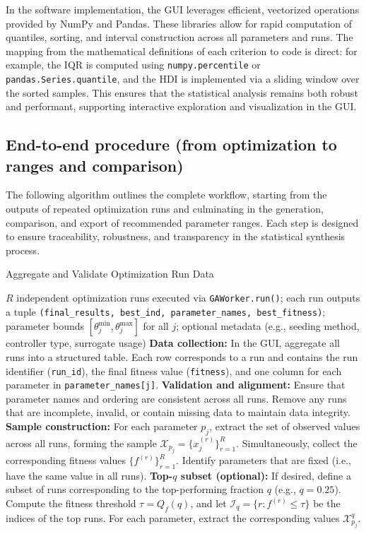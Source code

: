 \documentclass[12pt,a4paper]{article}
\begin{document}
In the software implementation, the GUI leverages efficient, vectorized operations provided by NumPy and Pandas. These libraries allow for rapid computation of quantiles, sorting, and interval construction across all parameters and runs. The mapping from the mathematical definitions of each criterion to code is direct: for example, the IQR is computed using \texttt{numpy.percentile} or \texttt{pandas.Series.quantile}, and the HDI is implemented via a sliding window over the sorted samples. This ensures that the statistical analysis remains both robust and performant, supporting interactive exploration and visualization in the GUI.

\subsection{End-to-end procedure (from optimization to ranges and comparison)}
The following algorithm outlines the complete workflow, starting from the outputs of repeated optimization runs and culminating in the generation, comparison, and export of recommended parameter ranges. Each step is designed to ensure traceability, robustness, and transparency in the statistical synthesis process.

\begin{algorithm}[H]
\caption{Aggregate and Validate Optimization Run Data}
\begin{algorithmic}[1]
\REQUIRE $R$ independent optimization runs executed via \texttt{GAWorker.run()}; each run outputs a tuple \texttt{(final\_results, best\_ind, parameter\_names, best\_fitness)}; parameter bounds $[\theta_j^{\min},\theta_j^{\max}]$ for all $j$; optional metadata (e.g., seeding method, controller type, surrogate usage)
\STATE \textbf{Data collection:} In the GUI, aggregate all runs into a structured table. Each row corresponds to a run and contains the run identifier (\texttt{run\_id}), the final fitness value (\texttt{fitness}), and one column for each parameter in \texttt{parameter\_names[j]}.
\STATE \textbf{Validation and alignment:} Ensure that parameter names and ordering are consistent across all runs. Remove any runs that are incomplete, invalid, or contain missing data to maintain data integrity.
\STATE \textbf{Sample construction:} For each parameter $p_j$, extract the set of observed values across all runs, forming the sample $\mathcal{X}_{p_j} = \{x^{(r)}_j\}_{r=1}^R$. Simultaneously, collect the corresponding fitness values $\{f^{(r)}\}_{r=1}^R$. Identify parameters that are fixed (i.e., have the same value in all runs).
\STATE \textbf{Top-$q$ subset (optional):} If desired, define a subset of runs corresponding to the top-performing fraction $q$ (e.g., $q=0.25$). Compute the fitness threshold $\tau = Q_f(q)$, and let $\mathcal{I}_q = \{ r : f^{(r)} \leq \tau \}$ be the indices of the top runs. For each parameter, extract the corresponding values $\mathcal{X}^{q}_{p_j}$.
\end{algorithmic}
\end{algorithm}
\end{document}
